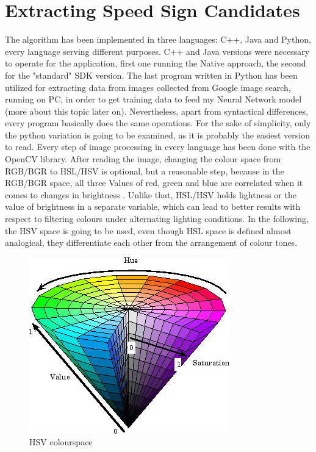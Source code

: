 \section{Extracting Speed Sign Candidates}
The algorithm has been implemented in three languages: C++, Java and Python, every language serving different purposes. C++ and Java versions were necessary to operate for the application, first one running the Native approach, the second for the "standard" SDK version. The last program written in Python has been utilized for extracting data from images collected from Google image search, running on PC, in order to get training data to feed my Neural Network model (more about this topic later on). Nevertheless, apart from syntactical differences, every program basically does the same operations. For the sake of simplicity, only the python variation is going to be examined, as it is probably the easiest version to read. Every step of image processing in every language has been done with the OpenCV library. \newline
After reading the image, changing the colour space from RGB/BGR to HSL/HSV is optional, but a reasonable step, because in the RGB/BGR space, all three Values of red, green and blue are correlated when it comes to changes in brightness \cite{imagesegmentation}. Unlike that, HSL/HSV holds lightness or the value of brightness in a separate variable, which can lead to better results with respect to filtering colours under alternating lighting conditions. In the following, the HSV space is going to be used, even though HSL space is defined almost analogical, they differentiate each other from the arrangement of colour tones. \newline

\begin{figure}[H]
	\centering
	\includegraphics[width=\linewidth]{images/hsv.jpg}
	\caption{HSV colourspace \cite{hsv}}\label{fig:hsv}
	\endminipage\hfill
\end{figure}


